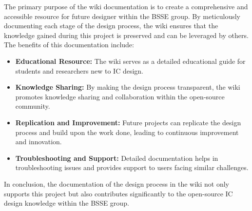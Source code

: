 The primary purpose of the wiki documentation is to create a comprehensive and accessible resource for future designer within the BSSE group. 
By meticulously documenting each stage of the design process, the wiki ensures that the knowledge gained during this project is preserved and can be leveraged by others. The benefits of this documentation include:

\begin{itemize}
    \item \textbf{Educational Resource:} The wiki serves as a detailed educational guide for students and researchers new to IC design.
    \item \textbf{Knowledge Sharing:} By making the design process transparent, the wiki promotes knowledge sharing and collaboration within the open-source community.
    \item \textbf{Replication and Improvement:} Future projects can replicate the design process and build upon the work done, leading to continuous improvement and innovation.
    \item \textbf{Troubleshooting and Support:} Detailed documentation helps in troubleshooting issues and provides support to users facing similar challenges.
\end{itemize}

In conclusion, the documentation of the design process in the wiki not only supports this project but also contributes significantly to the open-source IC design knowledge within the BSSE group.